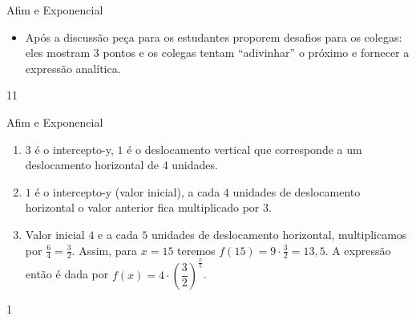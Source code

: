 \begin{sugestions}{Afim e Exponencial}
{
\begin{itemize}
\item Após a discussão peça para os estudantes proporem desafios para os colegas: eles mostram $3$ pontos e os colegas tentam “adivinhar” o próximo e fornecer a expressão analítica.

\end{itemize}
}{1}{1}
\end{sugestions}
\begin{answer}{Afim e Exponencial}
{
\begin{enumerate}

\item $3$ é o intercepto-y, $1$ é o deslocamento vertical que corresponde a um deslocamento horizontal de $4$ unidades.

\item
$1$ é o intercepto-y (valor inicial), a cada $4$ unidades de deslocamento horizontal o valor anterior fica multiplicado por $3$.

\item
Valor inicial $4$ e a cada $5$ unidades de deslocamento horizontal, multiplicamos por $\frac 64=\frac 32$. Assim, para $x=15$ teremos $f(15)=9\cdot \frac 32=13{,}5$.
A expressão então é dada por $f(x)=4\cdot \left(\dfrac 32\right)^{\frac x5}$.

\end{enumerate}
}{1}
\end{answer}



